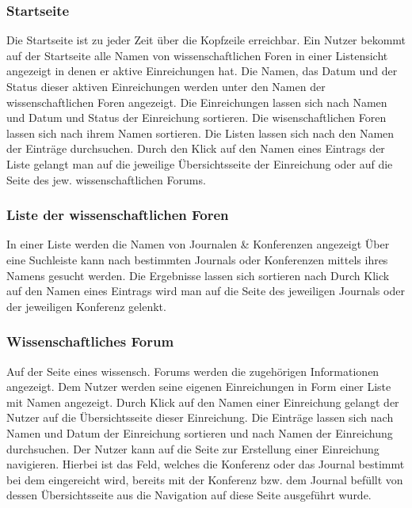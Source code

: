 \subsubsection{Startseite}
\begin{description}
    \XXitem{} Die Startseite ist zu jeder Zeit über die Kopfzeile erreichbar.
     Ein Nutzer bekommt auf der Startseite alle Namen von wissenschaftlichen Foren
    in einer Listensicht angezeigt in denen er aktive Einreichungen hat.
    Die Namen, das Datum und der Status dieser aktiven Einreichungen werden unter den Namen der wissenschaftlichen
    Foren angezeigt.
     Die Einreichungen lassen sich nach Namen und Datum und Status
    der Einreichung sortieren. Die wisenschaftlichen Foren lassen sich nach ihrem Namen sortieren.
     Die Listen lassen sich nach den Namen der Einträge durchsuchen.
    \XXitem{} Durch den Klick auf den Namen eines Eintrags der Liste gelangt man auf die jeweilige Übersichtsseite
    der Einreichung oder auf die Seite des jew. wissenschaftlichen Forums.
\end{description}

\subsubsection{Liste der wissenschaftlichen Foren}
\begin{description}
    \XXitem{} In einer Liste werden die Namen von Journalen \& Konferenzen angezeigt %
     Über eine Suchleiste kann nach bestimmten Journals oder Konferenzen mittels
    ihres Namens gesucht werden.
     Die Ergebnisse lassen sich sortieren nach %
     Durch Klick auf den Namen eines Eintrags wird man auf die Seite des
    jeweiligen Journals oder der jeweiligen Konferenz gelenkt.
\end{description}

\subsubsection{Wissenschaftliches Forum}
\begin{description}
     Auf der Seite eines wissensch. Forums werden die zugehörigen Informationen
    angezeigt. %
     Dem Nutzer werden seine eigenen Einreichungen in Form einer Liste mit Namen angezeigt.
     Durch Klick auf den Namen einer Einreichung gelangt der Nutzer auf die Übersichtsseite
    dieser Einreichung.
     Die Einträge lassen sich nach Namen und Datum
    der Einreichung sortieren und nach Namen der Einreichung durchsuchen. %
    \XXitem{} Der Nutzer kann auf die Seite zur Erstellung einer Einreichung navigieren. Hierbei ist
    das Feld, welches die Konferenz oder das Journal bestimmt bei dem eingereicht wird, bereits mit
    der Konferenz bzw. dem Journal befüllt von dessen Übersichtsseite aus die Navigation auf diese
    Seite ausgeführt wurde.
\end{description}

